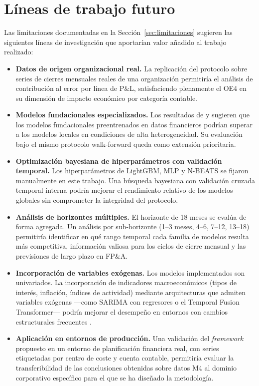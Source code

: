 \section{Líneas de trabajo futuro}
\label{sec:trabajo_futuro}

Las limitaciones documentadas en la Sección~\ref{sec:limitaciones} sugieren las siguientes líneas de investigación que aportarían valor añadido al trabajo realizado:

\begin{itemize}
  \item \textbf{Datos de origen organizacional real.} La replicación del protocolo sobre series de cierres mensuales reales de una organización permitiría el análisis de contribución al error por línea de P\&L, satisfaciendo plenamente el OE4 en su dimensión de impacto económico por categoría contable.

  \item \textbf{Modelos fundacionales especializados.} Los resultados de \textcite{Rahimikia2025} y \textcite{Zhu2025FinCast} sugieren que los modelos fundacionales preentrenados en datos financieros podrían superar a los modelos locales en condiciones de alta heterogeneidad. Su evaluación bajo el mismo protocolo walk-forward queda como extensión prioritaria.

  \item \textbf{Optimización bayesiana de hiperparámetros con validación temporal.} Los hiperparámetros de LightGBM, MLP y N-BEATS se fijaron manualmente en este trabajo. Una búsqueda bayesiana con validación cruzada temporal interna podría mejorar el rendimiento relativo de los modelos globales sin comprometer la integridad del protocolo.

  \item \textbf{Análisis de horizontes múltiples.} El horizonte de 18 meses se evalúa de forma agregada. Un análisis por sub-horizonte (1--3 meses, 4--6, 7--12, 13--18) permitiría identificar en qué rango temporal cada familia de modelos resulta más competitiva, información valiosa para los ciclos de cierre mensual y las previsiones de largo plazo en FP\&A.

  \item \textbf{Incorporación de variables exógenas.} Los modelos implementados son univariados. La incorporación de indicadores macroeconómicos (tipos de interés, inflación, índices de actividad) mediante arquitecturas que admiten variables exógenas ---como SARIMA con regresores o el Temporal Fusion Transformer--- podría mejorar el desempeño en entornos con cambios estructurales frecuentes \parencite{LimTFT2021}.

  \item \textbf{Aplicación en entornos de producción.} Una validación del \textit{framework} propuesto en un entorno de planificación financiera real, con series etiquetadas por centro de coste y cuenta contable, permitiría evaluar la transferibilidad de las conclusiones obtenidas sobre datos M4 al dominio corporativo específico para el que se ha diseñado la metodología.
\end{itemize}
